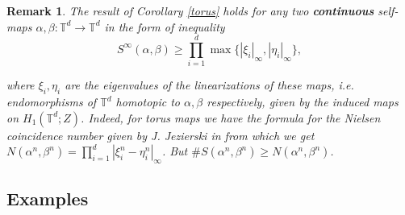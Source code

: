 \documentclass[oneside]{amsart}
\def\T{\mathbb{T}}
\newtheorem{rmk}[thm]{Remark}
\begin{document}
\begin{rmk}  The result of Corollary  \ref{torus} holds for any two {\bf continuous} self-maps
$\alpha, \beta: \T^d \to \T^d$ in the form of inequality
\begin{equation*}
    S^\infty(\alpha, \beta) \geq \prod_{i=1}^d \max \{ |\xi_i|_\infty, |\eta_i|_\infty \},
  \end{equation*}

where $\xi_i, \eta_i $ are the eigenvalues of the linearizations of these maps, i.e. endomorphisms of
$\T^d $ homotopic to $\alpha, \beta$ respectively, given by the induced maps on $H_1(\T^d; Z )$.
Indeed, for torus maps we have the formula for the Nielsen coincidence number given by J. Jezierski
in \cite{Jez2} from which we get $ N(\alpha^n, \beta^n)  = \prod_{i=1}^d | \xi_i^n - \eta_i^n |_\infty $.
But $ \# S(\alpha^n, \beta^n) \geq   N(\alpha^n, \beta^n) $.
\end{rmk}


\subsection{Examples}
\end{document}
